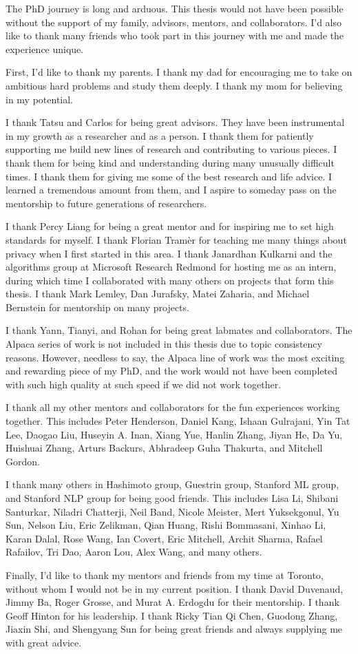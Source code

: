 
The PhD journey is long and arduous. 
This thesis would not have been possible without the support of my family, advisors, mentors, and collaborators.
I'd also like to thank many friends who took part in this journey with me and made the experience unique.

First, I'd like to thank my parents.
I thank my dad for encouraging me to take on ambitious hard problems and study them deeply.
I thank my mom for believing in my potential.

I thank Tatsu and Carlos for being great advisors.
They have been instrumental in my growth as a researcher and as a person.
I thank them for patiently supporting me build new lines of research and contributing to various pieces.
I thank them for being kind and understanding during many unusually difficult times.
I thank them for giving me some of the best research and life advice.
I learned a tremendous amount from them, and I aspire to someday pass on the mentorship to future generations of researchers.

I thank Percy Liang for being a great mentor and for inspiring me to set high standards for myself.
I thank Florian Tramèr for teaching me many things about privacy when I first started in this area.
I thank Janardhan Kulkarni and the algorithms group at Microsoft Research Redmond for hosting me as an intern, during which time I collaborated with many others on projects that form this thesis.
I thank Mark Lemley, Dan Jurafsky, Matei Zaharia, and Michael Bernstein for mentorship on many projects.

I thank Yann, Tianyi, and Rohan for being great labmates and collaborators.
The Alpaca series of work is not included in this thesis due to topic consistency reasons. 
However, needless to say, the Alpaca line of work was the most exciting and rewarding piece of my PhD, and the work would not have been completed with such high quality at such speed if we did not work together.

I thank all my other mentors and collaborators for the fun experiences working together. 
This includes Peter Henderson, Daniel Kang, Ishaan Gulrajani, Yin Tat Lee, Daogao Liu, Huseyin A. Inan, Xiang Yue, Hanlin Zhang, Jiyan He, Da Yu, Huishuai Zhang, Arturs Backurs, Abhradeep Guha Thakurta, and Mitchell Gordon.

I thank many others in Hashimoto group, Guestrin group, Stanford ML group, and Stanford NLP group for being good friends. 
This includes Lisa Li, Shibani Santurkar, Niladri Chatterji, Neil Band, Nicole Meister, Mert Yuksekgonul, Yu Sun, Nelson Liu, Eric Zelikman, Qian Huang, Rishi Bommasani, Xinhao Li, Karan Dalal, Rose Wang, Ian Covert, Eric Mitchell, Archit Sharma, Rafael Rafailov, Tri Dao, Aaron Lou, Alex Wang, and many others.

Finally, I'd like to thank my mentors and friends from my time at Toronto, without whom I would not be in my current position.
I thank David Duvenaud, Jimmy Ba, Roger Grosse, and Murat A. Erdogdu for their mentorship. 
I thank Geoff Hinton for his leadership.
I thank Ricky Tian Qi Chen, Guodong Zhang, Jiaxin Shi, and Shengyang Sun for being great friends and always supplying me with great advice.